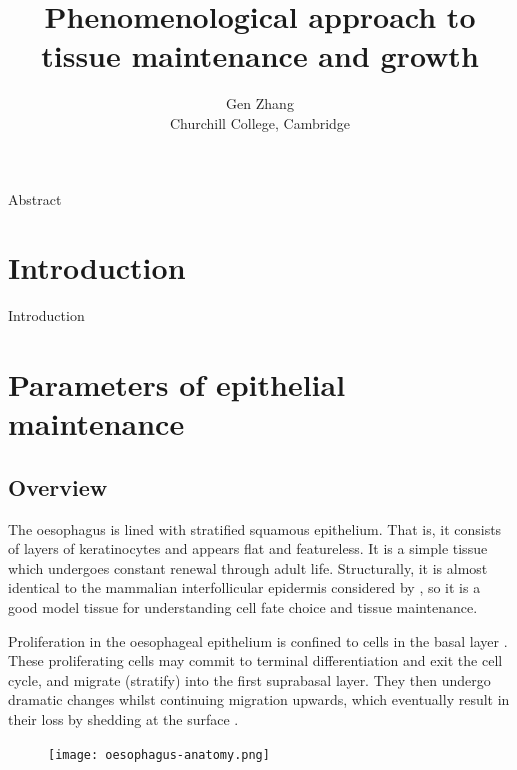 \documentclass[10pt,english]{report}
\begin{document}
\author{Gen Zhang\\
	Churchill College, Cambridge}
\title{Phenomenological approach to tissue maintenance and growth}

\maketitle



\begin{abstract}
\end{abstract}

Abstract


\tableofcontents

\chapter{Introduction}
\setcounter{page}{1}

Introduction \citep{clayton}

\chapter{Parameters of epithelial maintenance}

\section{Overview}

The oesophagus is lined with stratified squamous epithelium. That is, it consists of layers of keratinocytes and appears flat and featureless. It is a simple tissue which undergoes constant renewal through adult life. Structurally, it is almost identical to the mammalian interfollicular epidermis considered by \citet{clayton}, so it is a good model tissue for understanding cell fate choice and tissue maintenance.

Proliferation in the oesophageal epithelium is confined to cells in the basal layer \citep{leblond}. These proliferating cells may commit to terminal differentiation and exit the cell cycle, and migrate (stratify) into the first suprabasal layer. They then undergo dramatic changes whilst continuing migration upwards, which eventually result in their loss by shedding at the surface \citep{seery}.

\begin{figure}[htb]
	\centering
	\texttt{[image: oesophagus-anatomy.png]}
\end{figure}
\end{document}
